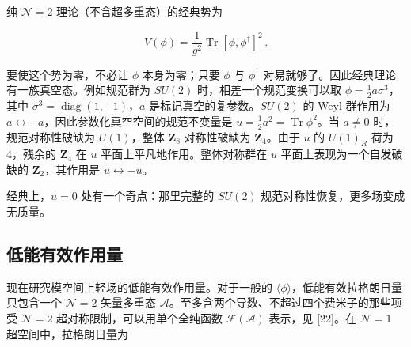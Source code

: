 \documentclass[11pt,a4paper,UTF8,fontset=fandol]{ctexart}
\theoremstyle{plain}
\theoremstyle{definition}
\begin{document}
纯 $\mathcal N=2$ 理论（不含超多重态）的经典势为

\begin{equation}
V(\phi)=\frac{1}{g^2}\operatorname{Tr}[\phi,\phi^\dagger]^2\,.\tag{2.6}
\end{equation}

要使这个势为零，不必让 $\phi$ 本身为零；只要 $\phi$ 与 $\phi^\dagger$ 对易就够了。因此经典理论有一族真空态。例如规范群为 $SU(2)$ 时，相差一个规范变换可以取 $\phi=\frac12a\sigma^3$，其中 $\sigma^3=\operatorname{diag}(1,-1)$，$a$ 是标记真空的复参数。$SU(2)$ 的 Weyl 群作用为 $a\leftrightarrow -a$，因此参数化真空空间的规范不变量是 $u=\frac12a^2=\operatorname{Tr}\phi^2$。当 $a\neq 0$ 时，规范对称性破缺为 $U(1)$，整体 $\mathbf Z_8$ 对称性破缺为 $\mathbf Z_4$。由于 $u$ 的 $U(1)_R$ 荷为 4，残余的 $\mathbf Z_4$ 在 $u$ 平面上平凡地作用。整体对称群在 $u$ 平面上表现为一个自发破缺的 $\mathbf Z_2$，其作用是 $u\leftrightarrow -u$。

经典上，$u=0$ 处有一个奇点：那里完整的 $SU(2)$ 规范对称性恢复，更多场变成无质量。




\subsection{低能有效作用量}

现在研究模空间上轻场的低能有效作用量。对于一般的 $\langle\phi\rangle$，低能有效拉格朗日量只包含一个 $\mathcal N=2$ 矢量多重态 $\mathcal A$。至多含两个导数、不超过四个费米子的那些项受 $\mathcal N=2$ 超对称限制，可以用单个全纯函数 $\mathcal F(\mathcal A)$ 表示，见 [22]。在 $\mathcal N=1$ 超空间中，拉格朗日量为
\end{document}

